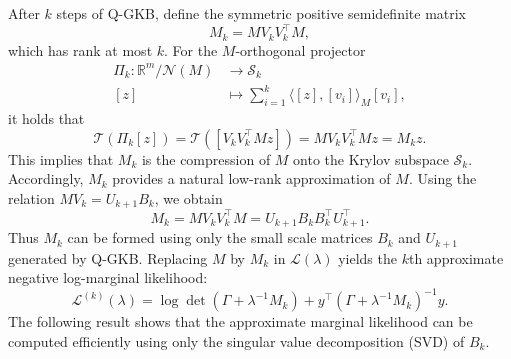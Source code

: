 \documentclass[]{myarticle}
\begin{document}
After $k$ steps of Q-GKB, define the symmetric positive semidefinite matrix 
\begin{equation}
  M_{k} = MV_{k}V_{k}^{\top}M ,
\end{equation}
which has rank at most $k$. For the $M$-orthogonal projector
\begin{align*}
  \Pi_k: \mathbb{R}^{m}/\mathcal{N}(M) &\longrightarrow \mathcal{S}_k \\
  [z] &\longmapsto \sum_{i=1}^{k}\langle [z], [v_i] \rangle_{M} [v_i] ,
\end{align*}
it holds that 
\begin{equation*}
  \mathcal{T}(\Pi_{k}[z]) = \mathcal{T}([V_{k}V_{k}^{\top}Mz])
  = MV_{k}V_{k}^{\top}Mz = M_kz.
\end{equation*}
This implies that $M_{k}$ is the compression of $M$ onto the Krylov subspace $\mathcal{S}_k$. Accordingly, $M_k$ provides a natural low-rank approximation of $M$. Using the relation $M V_k = U_{k+1} B_k$, we obtain
\begin{equation}
  M_k = MV_{k}V_{k}^{\top}M=U_{k+1}B_{k}B_{k}^{\top}U_{k+1}^{\top}.
\end{equation}
Thus $M_{k}$ can be formed using only the small scale matrices $B_{k}$ and $U_{k+1}$ generated by Q-GKB. Replacing $M$ by $M_k$ in $\mathcal{L}(\lambda)$ yields the $k$th approximate negative log-marginal likelihood:
\begin{equation}
  \mathcal{L}^{(k)}(\lambda) = \log \det(\Gamma+\lambda^{-1}M_k) + y^{\top}(\Gamma+\lambda^{-1}M_k)^{-1}y.
\end{equation}
The following result shows that the approximate marginal likelihood can be computed efficiently using only the singular value decomposition (SVD) of $B_{k}$.
\end{document}
